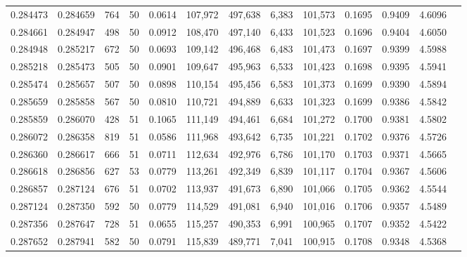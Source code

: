 \begin{tabular}{rrrrrrrrrrrrr}
0.284473 & 0.284659 &   764 &  50 &                                     0.0614 & 107,972 & 497,638 &   6,383 & 101,573 & 0.1695 & 0.9409 & 4.6096 \\
0.284661 & 0.284947 &   498 &  50 &                                     0.0912 & 108,470 & 497,140 &   6,433 & 101,523 & 0.1696 & 0.9404 & 4.6050 \\
0.284948 & 0.285217 &   672 &  50 &                                     0.0693 & 109,142 & 496,468 &   6,483 & 101,473 & 0.1697 & 0.9399 & 4.5988 \\
0.285218 & 0.285473 &   505 &  50 &                                     0.0901 & 109,647 & 495,963 &   6,533 & 101,423 & 0.1698 & 0.9395 & 4.5941 \\
0.285474 & 0.285657 &   507 &  50 &                                     0.0898 & 110,154 & 495,456 &   6,583 & 101,373 & 0.1699 & 0.9390 & 4.5894 \\
0.285659 & 0.285858 &   567 &  50 &                                     0.0810 & 110,721 & 494,889 &   6,633 & 101,323 & 0.1699 & 0.9386 & 4.5842 \\
0.285859 & 0.286070 &   428 &  51 &                                     0.1065 & 111,149 & 494,461 &   6,684 & 101,272 & 0.1700 & 0.9381 & 4.5802 \\
0.286072 & 0.286358 &   819 &  51 &                                     0.0586 & 111,968 & 493,642 &   6,735 & 101,221 & 0.1702 & 0.9376 & 4.5726 \\
0.286360 & 0.286617 &   666 &  51 &                                     0.0711 & 112,634 & 492,976 &   6,786 & 101,170 & 0.1703 & 0.9371 & 4.5665 \\
0.286618 & 0.286856 &   627 &  53 &                                     0.0779 & 113,261 & 492,349 &   6,839 & 101,117 & 0.1704 & 0.9367 & 4.5606 \\
0.286857 & 0.287124 &   676 &  51 &                                     0.0702 & 113,937 & 491,673 &   6,890 & 101,066 & 0.1705 & 0.9362 & 4.5544 \\
0.287124 & 0.287350 &   592 &  50 &                                     0.0779 & 114,529 & 491,081 &   6,940 & 101,016 & 0.1706 & 0.9357 & 4.5489 \\
0.287356 & 0.287647 &   728 &  51 &                                     0.0655 & 115,257 & 490,353 &   6,991 & 100,965 & 0.1707 & 0.9352 & 4.5422 \\
0.287652 & 0.287941 &   582 &  50 &                                     0.0791 & 115,839 & 489,771 &   7,041 & 100,915 & 0.1708 & 0.9348 & 4.5368 \\

\end{tabular}
